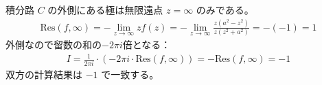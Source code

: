\documentclass[platex,dvipdfmx,a4paper]{jsarticle}
\begin{document}
  積分路 $C$ の外側にある極は無限遠点 $z=\infty$ のみである。
  \begin{align*}
  \text{Res}(f, \infty) = - \lim_{z \to \infty} z f(z) = - \lim_{z \to \infty} \frac{z(a^2-z^2)}{z(z^2+a^2)} = -(-1) = 1
  \end{align*}
  外側なので留数の和の$-2\pi i$倍となる：
  \begin{align*}
  I = \frac{1}{2\pi i} \cdot \left( -2\pi i \cdot \text{Res}(f, \infty) \right) = -\text{Res}(f, \infty) = -1
  \end{align*}
  双方の計算結果は $-1$ で一致する。
\end{document}
